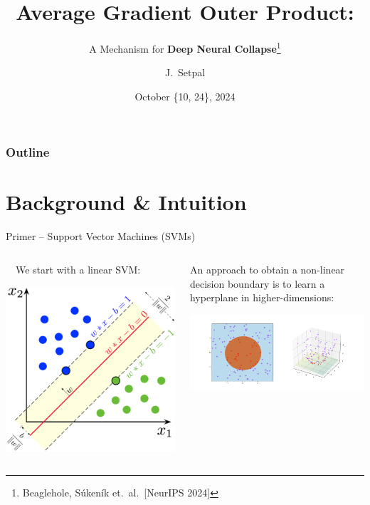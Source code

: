 \documentclass{beamer}
\title[How AGOP Induces DNC]{Average Gradient Outer Product:}
\subtitle{A Mechanism for \textbf{Deep Neural Collapse}\thanks{Beaglehole, Súkeník et.~al.~[NeurIPS 2024]}}
\author[Machine Learning @ Purdue] %
{J.~Setpal}
\date{October \{10, 24\}, 2024}
\begin{document}
\frame{\titlepage}


\begin{frame}
\frametitle{Outline}
\tableofcontents
\end{frame}

\section{Background \& Intuition}
\begin{frame}{Primer -- Support Vector Machines (SVMs)}
	\begin{columns}
		\begin{column}{.5\textwidth}
			~~We start with a linear SVM:
			\begin{center}
				\includegraphics[width=\textwidth]{img/svm.png}
			\end{center} \pause
		\end{column}
		\hspace{1em}
		\begin{column}{.5\textwidth}
			An approach to obtain a non-linear decision boundary is to learn a hyperplane in higher-dimensions:
			\begin{center}
				\includegraphics[width=\textwidth]{img/kernel.png}

\end{center}
\end{column}
\end{columns}
\end{frame}
\end{document}
